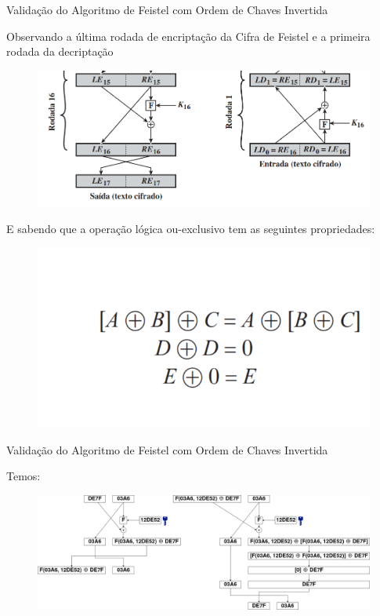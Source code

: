 \begin{frame}{Validação do Algoritmo de Feistel com Ordem de Chaves Invertida}

Observando a última rodada de encriptação da Cifra de Feistel e a primeira rodada da decriptação
\begin{figure}
    \centering
    \includegraphics[width=0.5\linewidth]{Figuras/ultima-milha-feistel.png}

\end{figure}

E sabendo que a  operação lógica ou-exclusivo  tem as
seguintes propriedades:

\begin{figure}
    \centering
    \includegraphics[width=0.4\linewidth]{Figuras/propriedades-xor-feistel.png}

\end{figure}

\end{frame}

\begin{frame}{Validação do Algoritmo de Feistel com Ordem de Chaves Invertida}

Temos:
\begin{figure}
    \centering
    \includegraphics[width=0.9\linewidth]{Figuras/feistel.png}

\end{figure}



\end{frame}

